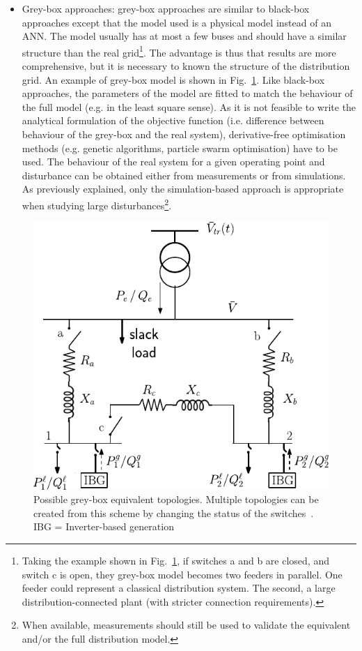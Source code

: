 \begin{itemize}
    \item Grey-box approaches: grey-box approaches are similar to black-box approaches except that the model used is a physical model instead of an ANN. The model usually has at most a few buses and should have a similar structure than the real grid\footnote{Taking the example shown in Fig.~\ref{fig:greyBox}, if switches a and b are closed, and switch c is open, they grey-box model becomes two feeders in parallel. One feeder could represent a classical distribution system. The second, a large distribution-connected plant (with stricter connection requirements).}. The advantage is thus that results are more comprehensive, but it is necessary to known  the structure of the distribution grid. An example of grey-box model is shown in Fig.~\ref{fig:greyBox}. Like black-box approaches, the parameters of the model are fitted to match the behaviour of the full model (e.g. in the least square sense). As it is not feasible to write the analytical formulation of the objective function (i.e. difference between behaviour of the grey-box and the real system), derivative-free optimisation methods (e.g. genetic algorithms, particle swarm optimisation) have to be used. The behaviour of the real system for a given operating point and disturbance can be obtained either from measurements or from simulations. As previously explained, only the simulation-based approach is appropriate when studying large disturbances\footnote{When available, measurements should still be used to validate the equivalent and/or the full distribution model.}.
\end{itemize}

\begin{figure}
    \centering
    \includegraphics[width=0.6\linewidth]{Figs/GreyBoxEquivalent.pdf}
    \caption{Possible grey-box equivalent topologies. Multiple topologies can be created from this scheme by changing the status of the switches~\cite{ChaspierreThesis}. IBG = Inverter-based generation}
    \label{fig:greyBox}
\end{figure}


